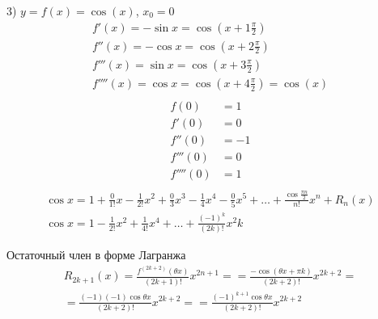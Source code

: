 3) $y = f(x) = \cos(x)$, $x_0 = 0$
\begin{align*}
  f'(x) = - \sin x = \cos\left(x + 1 \frac{\pi}{2}\right) \\
  f''(x) = -\cos x = \cos\left(x + 2 \frac{\pi}{2}\right) \\
  f'''(x) = \sin x = \cos\left(x + 3 \frac{\pi}{2}\right) \\
  f''''(x) = \cos x = \cos\left(x + 4 \frac{\pi}{2}\right) = \cos(x) \\
\end{align*}
\begin{align*}
  f(0) &= 1 \\
  f'(0) &= 0 \\
  f''(0) &= -1 \\
  f'''(0) &= 0 \\
  f''''(0) &= 1 \\
\end{align*}
\begin{gather*}
  \cos x = 1 + \frac{0}{1!} x - \frac{1}{2!} x^2 + \frac{0}{3} x^3 - \frac{1}{4} x^4 - \frac{0}{5}x^5 + \ldots + \frac{\cos \frac{\pi n}{2}}{n!} x^n + R_n(x) \\
  \cos x = 1 - \frac{1}{2!} x^2 + \frac{1}{4!} x^4 + \ldots + \frac{(-1)^k }{(2k)!} x^2k
\end{gather*}

Остаточный член в форме Лагранжа
\begin{gather*}
  R_{2k+1}(x) = \frac{f^{(2k+2)}(\theta x)}{(2k+1)!}x^{2n+1} = 
  = \frac{-\cos (\theta x + \pi k)}{(2k + 2)! } x^{2k+2} = \\
  = \frac{(-1)(-1)\cos \theta x}{(2k+2)!}x^{2k+2} = 
  = \frac{(-1)^{k+1} \cos \theta x}{(2k + 2)!} x^{2k+2}
\end{gather*}

